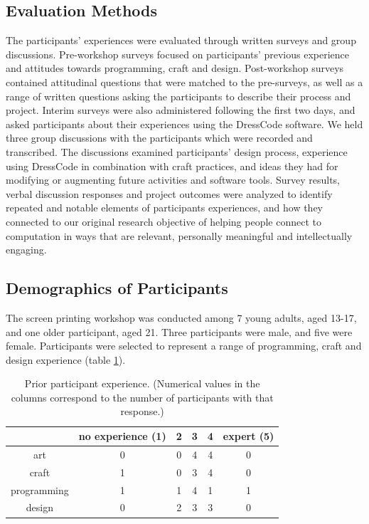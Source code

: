 \documentclass{sigchi}
\newcommand\tabhead[1]{\small\textbf{#1}}
\begin{document}
\subsection{Evaluation Methods}
The participants' experiences were evaluated through written surveys and group discussions. Pre-workshop surveys focused on participants' previous experience and attitudes towards programming, craft and design. Post-workshop surveys contained attitudinal questions that were matched to the pre-surveys, as well as a range of written questions asking the participants to describe their process and project. Interim surveys were also administered following the first two days, and asked participants about their experiences using the DressCode software. We held three group discussions with the participants which were recorded and transcribed. The discussions examined participants' design process, experience using DressCode in combination with craft practices, and ideas they had for modifying or augmenting future activities and software tools. Survey results, verbal discussion responses and project outcomes were analyzed to identify repeated and notable elements of participants experiences, and how they connected to our original research objective of helping people connect to computation in ways that are relevant, personally meaningful and intellectually engaging.

\subsection{Demographics of Participants}
The screen printing workshop was conducted among 7 young adults, aged 13-17, and one older participant, aged 21. Three participants were male, and five were female. Participants were selected to represent a range of programming, craft and design experience (table \ref{table:experience}).
\begin{table}
  \centering
  \begin{tabular}{|c|c|c|c|c|c|}
    \hline
    \multicolumn{1}{|p{0.75cm}|}{\centering\tabhead{}} &
    \multicolumn{1}{|p{1.3cm}|}{\centering\small{no experience (1)}} &
    \multicolumn{1}{|p{0.75cm}|}{\centering\small{2}}&
    \multicolumn{1}{|p{0.75cm}|}{\centering\small{3}}&
    \multicolumn{1}{|p{0.75cm}|}{\centering\small{4}}&
    \multicolumn{1}{|p{0.75cm}|}{\centering\small{expert (5)}}\\
    \hline
    \small{art} & 0 & 0 & 4 & 4 & 0\\
    \hline
    \small{craft} & 1 & 0 & 3 & 4& 0  \\
    \hline
	\small{programming} & 1 & 1 & 4 & 1& 1  \\
    \hline
	\small{design} & 0 & 2 & 3 & 3& 0  \\
    \hline
  \end{tabular}
  \caption{Prior participant experience. (Numerical values in the columns correspond to the number of participants with that response.)}
\label{table:experience}
\end{table}
\end{document}
